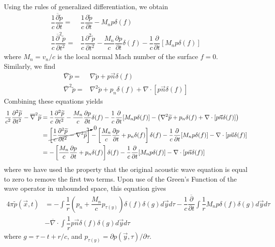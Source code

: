 \documentclass[onecolumn,10pt]{jhwhw}
\begin{document}
\solution
Using the rules of generalized differentiation, we obtain
\begin{align*}
\dfrac{1}{c} \dfrac{\overline{\partial} \widetilde{p}}{\partial t} =& \dfrac{1}{c} \dfrac{\partial \widetilde{p}}{\partial t} - M_n p \delta (f) \\
\dfrac{1}{c} \dfrac{\overline{\partial}^2 \widetilde{p}}{\partial t^2} =& \dfrac{1}{c} \dfrac{\partial^2 \widetilde{p}}{\partial t^2}
- \dfrac{M_n}{c} \dfrac{\partial p}{\partial t} \delta (f)
-\dfrac{1}{c} \dfrac{\partial}{\partial t} [M_n p \delta (f)]
\end{align*}
where $M_n = v_n/c$ is the local normal Mach number of the surface $f=0$. Similarly, we find
\begin{align*}
\overline{\nabla} \widetilde{p} =& \nabla \widetilde{p} + p \vec{n} \delta (f) \\
\overline{\nabla}^2 \widetilde{p} =& \nabla^2 \widetilde{p} + p_n \delta (f)
+ \nabla \cdot [p \vec{n} \delta (f)]
\end{align*}
Combining these equations yields
\begin{align*}
\dfrac{1}{c^2} \dfrac{\partial^2 \widetilde{p}}{\partial t^2}
- \overline{\nabla}^2 \widetilde{p}
&=
\dfrac{1}{c} \dfrac{\partial^2 \widetilde{p}}{\partial t^2}
- \dfrac{M_n}{c} \dfrac{\partial p}{\partial t} \delta (f)
-\dfrac{1}{c} \dfrac{\partial}{\partial t} [M_n p \delta (f)]
- \left( \nabla^2 \widetilde{p} + p_n \delta (f)
+ \nabla \cdot [p \vec{n} \delta (f)] \right) \\
&=
\cancelto{0}{
\left [\dfrac{1}{c} \dfrac{\partial^2 \widetilde{p}}{\partial t^2}  - \nabla^2 \widetilde{p} \right]}
- \left[ \dfrac{M_n}{c} \dfrac{\partial p}{\partial t} + p_n \delta (f)\right] \delta (f)
-\dfrac{1}{c} \dfrac{\partial}{\partial t} [M_n p \delta (f)]
- \nabla \cdot [p \vec{n} \delta (f)] \\
&=
- \left[ \dfrac{M_n}{c} \dfrac{\partial p}{\partial t} + p_n \delta (f)\right] \delta (f)
-\dfrac{1}{c} \dfrac{\partial}{\partial t} [M_n p \delta (f)]
- \nabla \cdot [p \vec{n} \delta (f)]
\end{align*}
where we have used the property that the original acoustic wave equation is equal to zero to remove the first two terms. Upon use of the Green's Function of the wave operator in unbounded space, this equation gives
\begin{align*}
4 \pi \widetilde{p}(\vec{x}, t) &=
- \int \dfrac{1}{r} \left( p_n + \dfrac{M_n}{c} p_{\tau(y)} \right) \delta (f) \delta(g) d \vec{y} d \tau
- \dfrac{1}{c} \dfrac{\overline{\partial}}{\partial t} \int \dfrac{1}{r} M_n p \delta (f) \delta(g) d \vec{y} d \tau \\
&- \overline{\nabla} \cdot \int \dfrac{1}{r} p \vec{n} \delta (f) \delta (g) d \vec{y} d \tau
\end{align*}
where $g=\tau - t + r/c$, and $p_{\tau (y)} = \partial p (\vec{y}, \tau) / \partial \tau$.
\end{document}
